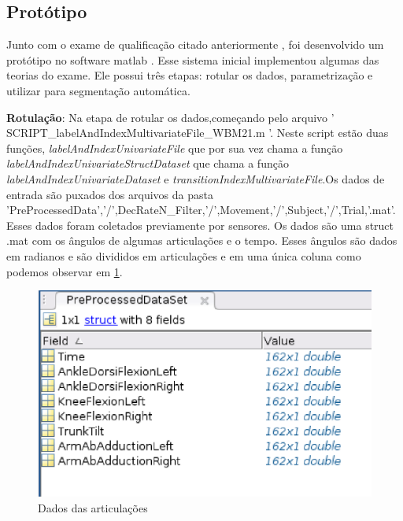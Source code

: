   \subsection{Protótipo}
  \label{Sec:protótipo}
    Junto com o exame de qualificação citado anteriormente \cite{roberto}, foi
  desenvolvido um protótipo no software matlab \cite{matlab}. Esse sistema inicial
  implementou algumas das teorias do exame. Ele possui três etapas: rotular os dados,
  parametrização e utilizar para segmentação automática.
  \begin{itemize}

  \begin{sloppypar}

  \item \textbf{Rotulação}: Na etapa de rotular os dados,começando pelo arquivo
  ' SCRIPT\_labelAndIndexMultivariateFile\_WBM21.m '. Neste script estão duas funções,
  \textit{labelAndIndexUnivariateFile} que por sua vez chama a função
  \textit{labelAndIndexUnivariateStructDataset} que chama a função \textit{labelAndIndexUnivariateDataset}
  e \textit{transitionIndexMultivariateFile}.Os dados de entrada são puxados dos arquivos da pasta
  'PreProcessedData','/',DecRateN\_Filter,'/',Movement,'/',Subject,'/',Trial,'.mat'.
  Esses dados foram coletados previamente por sensores. Os dados são uma struct .mat
  com  os ângulos de algumas articulações e o tempo. Esses ângulos são dados em radianos
   e são divididos em articulações e em uma única coluna como podemos observar em \ref{structMatlab}.

  \begin{figure}[!h]
  \centering
  \includegraphics [keepaspectratio=true,scale=0.60]{figuras/structMatlab.eps}
  \caption{Dados das articulações}
  \label{structMatlab}
  \end{figure}


\end{sloppypar}
\end{itemize}
